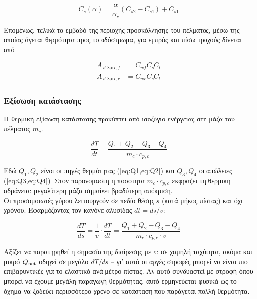\begin{equation}
    C_s(\alpha) = \dfrac{\alpha}{\alpha_c}(C_{s2}-C_{s1}) + C_{s1}
    \label{eq:contactArea2}
\end{equation}

Επομένως, τελικά το εμβαδό της περιοχής προσκόλλησης του πέλματος, μέσω της οποίας άγεται θερμότητα προς το οδόστρωμα, για εμπρός και πίσω τροχούς δίνεται από

\begin{equation}
    \begin{aligned}
        A_{\text{πέλμα},f} &= C_{wf}C_sC_l\\
        A_{\text{πέλμα},r} &= C_{wr}C_sC_l
    \end{aligned}
    \label{eq:contactArea3}
\end{equation}

\subsubsection{Εξίσωση κατάστασης}

Η θερμική εξίσωση κατάστασης προκύπτει από ισοζύγιο ενέργειας στη μάζα του πέλματος $m_c$.

\begin{equation}
    \frac{dT}{dt} = \frac{Q_1 + Q_2 - Q_3 - Q_4}{m_c \cdot c_{p,c}}
    \label{eq:dTdt_full}
\end{equation}

Εδώ $Q_1, Q_2$ είναι οι πηγές θερμότητας (\cref{eq:Q1,eq:Q2}) και $Q_3, Q_4$ οι απώλειες
(\cref{eq:Q3,eq:Q4}). Στον παρονομαστή η ποσότητα $m_c \cdot c_{p,c}$ εκφράζει τη θερμική
αδράνεια: μεγαλύτερη μάζα σημαίνει βραδύτερη απόκριση.\\[0.5cm]

Οι προσομοιωτές γύρου λειτουργούν σε πεδίο θέσης $s$ (κατά μήκος πίστας) και όχι χρόνου.
Εφαρμόζοντας τον κανόνα αλυσίδας $dt = ds/v$:

\begin{equation}
    \frac{dT}{ds} = \frac{1}{v}\cdot\frac{dT}{dt} = \frac{Q_1 + Q_2 - Q_3 - Q_4}{m_c \cdot c_{p,c} \cdot v}
    \label{eq:dTds_full}
\end{equation}

Αξίζει να παρατηρηθεί η σημασία της διαίρεσης με $v$: σε χαμηλή ταχύτητα,
ακόμα και μικρό $Q_{\rm net}$ οδηγεί σε μεγάλο $dT/ds$ -- γι' αυτό οι αργές στροφές μπορεί
να είναι πιο επιβαρυντικές για το ελαστικό ανά μέτρο πίστας. Αν αυτό συνδυαστεί με στροφή
όπου μπορεί να έχουμε μεγάλη παραγωγή θερμότητας, αυτό ερμηνεύεται φυσικά ως το όχημα να
ξοδεύει περισσότερο χρόνο σε κατάσταση που παράγεται πολλή θερμότητα.

